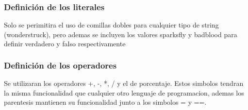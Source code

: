 \documentclass{article}
\begin{document}
                \subsubsection{Definición de los literales}
                Solo se perimitira el uso de comillas dobles para cualquier tipo de string (wonderstruck), pero ademas se incluyen los valores sparksfly y badblood para definir verdadero y falso respectivamente

                \subsubsection{Definición de los operadores}
                Se utilizaran los operadores +, -, *, / y el de porcentaje. Estos simbolos tendran la misma funcionalidad que cualquier otro lenguaje de programacion, ademas los parentesis mantienen su funcionalidad junto a los simbolos = y ==.
                
\end{document}
